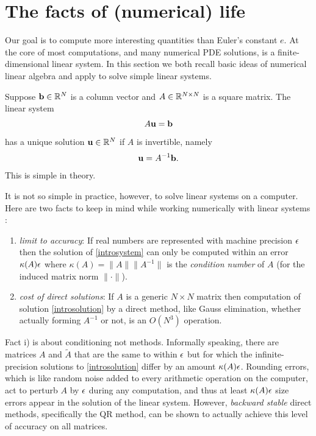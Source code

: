 
\section{The facts of (numerical) life}

Our goal is to compute more interesting quantities than Euler's constant $e$.  At the core of most \PETSc computations, and many numerical PDE solutions, is a finite-dimensional linear system.  In this section we both recall basic ideas of numerical linear algebra and apply \PETSc to solve simple linear systems.

Suppose $\mathbf{b}\in \mathbb{R}^{N}$ is a column vector and $A\in\mathbb{R}^{N\times N}$ is a square matrix.  The linear system
\begin{equation}
A \mathbf{u} = \mathbf{b} \label{introsystem}
\end{equation}
has a unique solution $\mathbf{u}\in \mathbb{R}^{N}$ if $A$ is invertible, namely
\begin{equation}
\mathbf{u} = A^{-1} \mathbf{b}. \label{introsolution}
\end{equation}
This is simple in theory.

It is not so simple in practice, however, to solve linear systems on a computer.  Here are two facts to keep in mind while working numerically with linear systems \citep{TrefethenBau1997}:
\renewcommand{\labelenumi}{\roman{enumi})}
\begin{enumerate}
\item \label{limittoaccuracy} \emph{limit to accuracy}:  If real numbers are represented with machine precision $\epsilon$ then the solution of \eqref{introsystem} can only be computed within an error $\kappa(A) \epsilon$ where $\kappa(A) = \|A\| \|A^{-1}\|$ is the \emph{condition number} of $A$ (for the induced matrix norm $\|\cdot\|$).
\item \emph{cost of direct solutions}:  If $A$ is a generic $N\times N$ matrix then computation of solution \eqref{introsolution} by a direct method, like Gauss elimination, whether actually forming $A^{-1}$ or not, is an $O(N^3)$ operation.
\end{enumerate}

Fact i) is about conditioning not methods.  Informally speaking, there are matrices $A$ and $\tilde A$ that are the same to within $\epsilon$ but for which the infinite-precision solutions to \eqref{introsolution} differ by an amount $\kappa(A) \epsilon$.  Rounding errors, which is like random noise added to every arithmetic operation on the computer, act to perturb $A$ by $\epsilon$ during any computation, and thus at least $\kappa(A) \epsilon$ size errors appear in the solution of the linear system.  However, \emph{backward stable} direct methods, specifically the QR method, can be shown to actually achieve this level of accuracy on all matrices.

